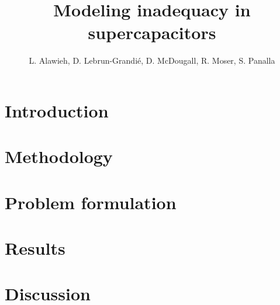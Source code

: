\documentclass[12pt]{article}
\title{Modeling inadequacy in supercapacitors}
\author{L. Alawieh, D. Lebrun-Grandi\'e, D. McDougall, R. Moser, S. Panalla}
\begin{document}
\maketitle

\baselineskip=22pt

\section{Introduction}

\section{Methodology}


\section{Problem formulation}
%
%

\section{Results}

\section{Discussion}
\end{document}
